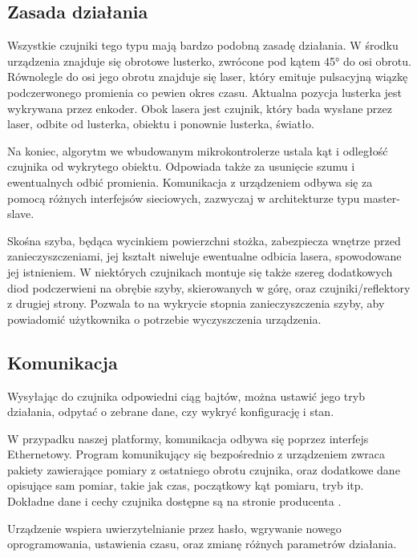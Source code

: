 	\subsection{Zasada działania}
	Wszystkie czujniki tego typu mają bardzo podobną zasadę działania.
	W środku urządzenia znajduje się obrotowe lusterko, zwrócone pod kątem 45° do osi obrotu.
	Równolegle do osi jego obrotu znajduje się laser, który emituje pulsacyjną wiązkę podczerwonego promienia co pewien okres czasu.
	Aktualna pozycja lusterka jest wykrywana przez enkoder.
	Obok lasera jest czujnik, który bada wysłane przez laser, odbite od lusterka, obiektu i ponownie lusterka, światło.

	Na koniec, algorytm we wbudowanym mikrokontrolerze ustala kąt i odległość czujnika od wykrytego obiektu.
	Odpowiada także za usunięcie szumu i ewentualnych odbić promienia.
	Komunikacja z urządzeniem odbywa się za pomocą różnych interfejsów sieciowych, zazwyczaj w architekturze typu master-slave.
	
	Skośna szyba, będąca wycinkiem powierzchni stożka, zabezpiecza wnętrze przed zanieczyszczeniami, jej kształt niweluje ewentualne odbicia lasera, spowodowane jej istnieniem.
	W niektórych czujnikach montuje się także szereg dodatkowych diod podczerwieni na obrębie szyby, skierowanych w górę, oraz czujniki/reflektory z drugiej strony.
	Pozwala to na wykrycie stopnia zanieczyszczenia szyby, aby powiadomić użytkownika o potrzebie wyczyszczenia urządzenia.

	\subsection{Komunikacja}
	Wysyłając do czujnika odpowiedni ciąg bajtów, można ustawić jego tryb działania, odpytać o zebrane dane, czy wykryć konfigurację i stan.

	W przypadku naszej platformy, komunikacja odbywa się poprzez interfejs Ethernetowy.
	Program komunikujący się bezpośrednio z urządzeniem zwraca pakiety zawierające pomiary z ostatniego obrotu czujnika, oraz dodatkowe dane 
	opisujące sam pomiar, takie jak czas, początkowy kąt pomiaru, tryb itp.
	Dokładne dane i cechy czujnika dostępne są na stronie producenta \cite{sick_website}.

	Urządzenie wspiera uwierzytelnianie przez hasło, wgrywanie nowego oprogramowania,
	ustawienia czasu, oraz zmianę różnych parametrów działania.

